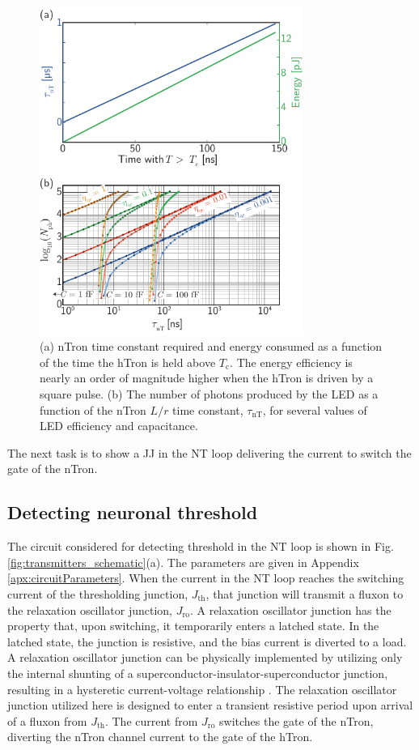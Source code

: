 \documentclass[twocolumn]{article}
\begin{document}
\begin{figure}[t!]
	\centerline{\includegraphics[width=8.6cm]{_transmitters_hTron_data_2_small.pdf}}
	\caption{\label{fig:transmitters_hTron_data_2}(a) nTron time constant required and energy consumed as a function of the time the hTron is held above $T_{\mathrm{c}}$. The energy efficiency is nearly an order of magnitude higher when the hTron is driven by a square pulse. (b) The number of photons produced by the LED as a function of the nTron $L/r$ time constant, $\tau_{\mathrm{nT}}$, for several values of LED efficiency and capacitance.}
\end{figure}
The next task is to show a JJ in the NT loop delivering the current to switch the gate of the nTron.
	
\subsection{\label{sec:detectingThreshold}Detecting neuronal threshold}
The circuit considered for detecting threshold in the NT loop is shown in Fig.\,\ref{fig:transmitters_schematic}(a). The parameters are given in Appendix \ref{apx:circuitParameters}. When the current in the NT loop reaches the switching current of the thresholding junction, $J_{\mathrm{th}}$, that junction will transmit a fluxon to the relaxation oscillator junction, $J_{\mathrm{ro}}$. A relaxation oscillator junction has the property that, upon switching, it temporarily enters a latched state. In the latched state, the junction is resistive, and the bias current is diverted to a load. A relaxation oscillator junction can be physically implemented by utilizing only the internal shunting of a superconductor-insulator-superconductor junction, resulting in a hysteretic current-voltage relationship \cite{vatu1998}. The relaxation oscillator junction utilized here is designed to enter a transient resistive period upon arrival of a fluxon from $J_{\mathrm{th}}$. The current from $J_{\mathrm{ro}}$ switches the gate of the nTron, diverting the nTron channel current to the gate of the hTron. 
\end{document}
